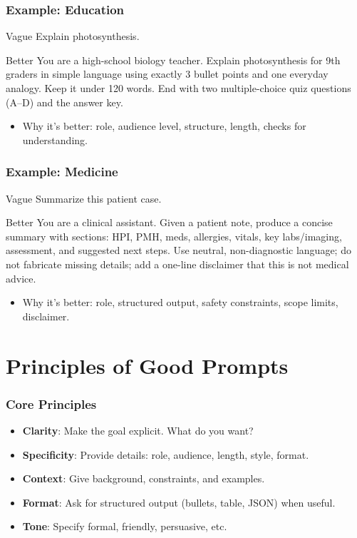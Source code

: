 \documentclass[11pt]{beamer}
\begin{document}
\begin{frame}
  \frametitle{Example: Education}
  \begin{block}{Vague}
  Explain photosynthesis.
  \end{block}
  \begin{block}{Better}
  You are a high-school biology teacher. Explain photosynthesis for 9th graders in simple language using exactly 3 bullet points and one everyday analogy. Keep it under 120 words. End with two multiple-choice quiz questions (A--D) and the answer key.
  \end{block}
  \begin{itemize}
    \item Why it's better: role, audience level, structure, length, checks for understanding.
  \end{itemize}
\end{frame}

\begin{frame}
  \frametitle{Example: Medicine}
  \begin{block}{Vague}
  Summarize this patient case.
  \end{block}
  \begin{block}{Better}
  You are a clinical assistant. Given a patient note, produce a concise summary with sections: HPI, PMH, meds, allergies, vitals, key labs/imaging, assessment, and suggested next steps. Use neutral, non-diagnostic language; do not fabricate missing details; add a one-line disclaimer that this is not medical advice.
  \end{block}
  \begin{itemize}
    \item Why it's better: role, structured output, safety constraints, scope limits, disclaimer.
  \end{itemize}
\end{frame}

\section{Principles of Good Prompts}
\begin{frame}
  \frametitle{Core Principles}
  \begin{itemize}
    \item \textbf{Clarity}: Make the goal explicit. What do you want?
    \item \textbf{Specificity}: Provide details: role, audience, length, style, format.
    \item \textbf{Context}: Give background, constraints, and examples.
    \item \textbf{Format}: Ask for structured output (bullets, table, JSON) when useful.
    \item \textbf{Tone}: Specify formal, friendly, persuasive, etc.
  \end{itemize}
\end{frame}
\end{document}
